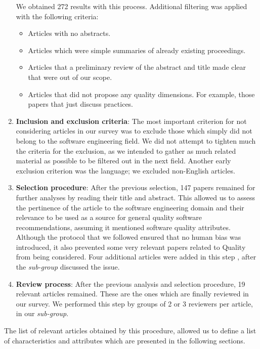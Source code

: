 \documentclass[a4paper]{article}
\begin{document}
\begin{enumerate}
    We obtained 272 results with this process. Additional filtering was applied with the following criteria:
    \begin{itemize}
        \item Articles with no abstracts.
        \item Articles which were simple summaries of already existing proceedings.
        \item Articles that a preliminary review of the abstract and title made clear that were out of our scope.
        \item Articles that did not propose any quality dimensions. For example, those papers that just discuss practices.
    \end{itemize}

    \item \textbf{Inclusion and exclusion criteria}: The most important criterion for not considering articles in our survey was to exclude those which simply did not belong to the software engineering field. We did not attempt to tighten much the criteria for the exclusion, as we intended to gather as much related material as possible to be filtered out in the next field. Another early exclusion criterion was the language; we excluded non-English articles.

    \item \textbf{Selection procedure}: After the previous selection, 147 papers remained for further analyses by reading their title and abstract. This allowed us to assess the pertinence of the article to the software engineering domain and their relevance to be used as a source for general quality software recommendations, assuming it mentioned software quality attributes. Although the protocol that we followed ensured that no human bias was introduced, it also prevented some very relevant papers related to Quality from being considered. Four additional articles were added in this step \cite{orviz_set_2017,orviz_fernandez_eosc-synergy_2020,raymond_software_2013,shepherdson_cessda_2019}, after the \textit{sub-group} discussed the issue.

    \item \textbf{Review process}: After the previous analysis and selection procedure, 19 relevant articles remained. These are the ones which are finally reviewed in our survey. We performed this step by groups of 2 or 3 reviewers per article, in our \textit{sub-group}.
\end{enumerate}

The list of relevant articles obtained by this procedure, allowed us to define a list of characteristics and attributes which are presented in the following sections.
\end{document}
